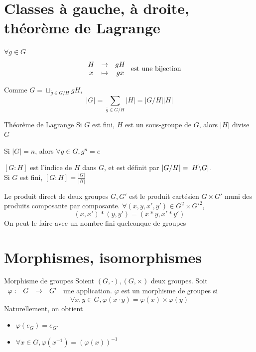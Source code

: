 \documentclass[]{report}
\begin{document}
\section{Classes à gauche, à droite, théorème de Lagrange}

\begin{prop}{}{}
    $\forall g\in G$
    \[\begin{array}{ccccc} & H & \to & gH \\ & x & \mapsto & gx \end{array}\text{ est une bijection}\]
\end{prop}

\begin{cor}{}{}
    Comme $G=\sqcup_{\overline{g}\in G/H} gH$, 
    \[\left|G\right|=\sum_{\overline{g}\in G/H} \left|H\right|= \left|G/H\right||H|\]
\end{cor}

\begin{tm}{Théorème de Lagrange}{}
    Si $G$ est fini, $H$ est un sous-groupe de $G$, alors $|H|$ divise $G$
\end{tm}

\begin{cor}{}{}
    Si $|G|=n$, alors $\forall g\in G, g^n=e$
\end{cor}

\begin{df}{}{}
    $[G:H]$ est l'indice de $H$ dans $G$, et est définit par $|G/H|=|H\backslash G|$.\\
    Si $G$ est fini, $[G:H]=\frac{|G|}{|H|}$
\end{df}

\begin{df}{}{}
    Le produit direct de deux groupes $G,G'$ est le produit cartésien $G\times G'$ muni des produits composante par composante. $\forall (x,y,x',y')\in G^2\times G'^2$,
    \[(x,x')*(y,y')=(x*y,x'*y')\]
    On peut le faire avec un nombre fini quelconque de groupes
\end{df}

\section{Morphismes, isomorphismes}

\begin{df}{Morphisme de groupes}{}
    Soient $(G,\cdot),(G,\times)$ deux groupes. Soit $\begin{array}{ccccc} \varphi : & G & \to & G' \end{array}$ une application. $\varphi$ est un morphisme de groupes si
    \[\forall x,y\in G, \varphi(x\cdot y)=\varphi(x)\times \varphi(y)\]
    Naturellement, on obtient
    \begin{itemize}
        \item $\varphi(e_G)=e_{G'}$
        \item $\forall x\in G, \varphi(x^{-1})=\left(\varphi(x)\right)^{-1}$
    \end{itemize}
\end{df}
\end{document}
